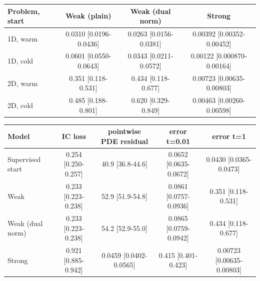 \begin{tabular}{lccc}
\toprule
Problem, start & Weak (plain) & Weak (dual norm) & Strong \\
\midrule
1D, warm & 0.0310 {\scriptsize[0.0196-0.0436]} & 0.0263 {\scriptsize[0.0156-0.0381]} & 0.00392 {\scriptsize[0.00352-0.00452]} \\
1D, cold & 0.0601 {\scriptsize[0.0550-0.0643]} & 0.0343 {\scriptsize[0.0211-0.0572]} & 0.00122 {\scriptsize[0.000870-0.00164]} \\
2D, warm & 0.351 {\scriptsize[0.118-0.531]} & 0.434 {\scriptsize[0.118-0.677]} & 0.00723 {\scriptsize[0.00635-0.00803]} \\
2D, cold & 0.485 {\scriptsize[0.188-0.801]} & 0.620 {\scriptsize[0.329-0.849]} & 0.00463 {\scriptsize[0.00260-0.00598]} \\
\bottomrule
\end{tabular}

\begin{tabular}{lcccc}
\toprule
Model & IC loss & pointwise PDE residual & error t=0.01 & error t=1 \\
\midrule
Supervised start & 0.254 {\scriptsize[0.250-0.257]} & 40.9 {\scriptsize[36.8-44.6]} & 0.0652 {\scriptsize[0.0635-0.0672]} & 0.0430 {\scriptsize[0.0365-0.0473]} \\
Weak & 0.233 {\scriptsize[0.223-0.238]} & 52.9 {\scriptsize[51.9-54.8]} & 0.0861 {\scriptsize[0.0757-0.0936]} & 0.351 {\scriptsize[0.118-0.531]} \\
Weak (dual norm) & 0.233 {\scriptsize[0.223-0.238]} & 54.2 {\scriptsize[52.9-55.0]} & 0.0865 {\scriptsize[0.0759-0.0942]} & 0.434 {\scriptsize[0.118-0.677]} \\
Strong & 0.921 {\scriptsize[0.885-0.942]} & 0.0459 {\scriptsize[0.0402-0.0565]} & 0.415 {\scriptsize[0.401-0.423]} & 0.00723 {\scriptsize[0.00635-0.00803]} \\
\bottomrule
\end{tabular}


